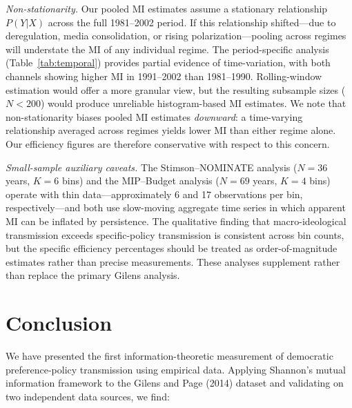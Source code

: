 \documentclass[twocolumn,10pt]{article}
\begin{document}
\emph{Non-stationarity.}  Our pooled MI estimates assume a stationary relationship $P(Y|X)$ across the full 1981--2002 period.  If this relationship shifted---due to deregulation, media consolidation, or rising polarization---pooling across regimes will understate the MI of any individual regime.  The period-specific analysis (Table~\ref{tab:temporal}) provides partial evidence of time-variation, with both channels showing higher MI in 1991--2002 than 1981--1990.  Rolling-window estimation would offer a more granular view, but the resulting subsample sizes ($N < 200$) would produce unreliable histogram-based MI estimates.  We note that non-stationarity biases pooled MI estimates \emph{downward}: a time-varying relationship averaged across regimes yields lower MI than either regime alone.  Our efficiency figures are therefore conservative with respect to this concern.

\emph{Small-sample auxiliary caveats.}  The Stimson--NOMINATE analysis ($N=36$ years, $K=6$ bins) and the MIP--Budget analysis ($N=69$ years, $K=4$ bins) operate with thin data---approximately 6 and 17 observations per bin, respectively---and both use slow-moving aggregate time series in which apparent MI can be inflated by persistence.  The qualitative finding that macro-ideological transmission exceeds specific-policy transmission is consistent across bin counts, but the specific efficiency percentages should be treated as order-of-magnitude estimates rather than precise measurements.  These analyses supplement rather than replace the primary Gilens analysis.

\section{Conclusion}
\label{sec:conclusion}

We have presented the first information-theoretic measurement of democratic preference-policy transmission using empirical data.  Applying Shannon's mutual information framework to the Gilens and Page (2014) dataset and validating on two independent data sources, we find:
\end{document}
